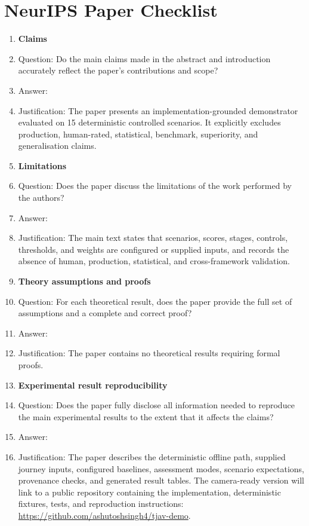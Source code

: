 \section*{NeurIPS Paper Checklist}

\begin{enumerate}

\item {\bf Claims}
\item[] Question: Do the main claims made in the abstract and introduction accurately reflect the paper's contributions and scope?
\item[] Answer: \answerYes{}
\item[] Justification: The paper presents an implementation-grounded demonstrator evaluated on 15 deterministic controlled scenarios. It explicitly excludes production, human-rated, statistical, benchmark, superiority, and generalisation claims.

\item {\bf Limitations}
\item[] Question: Does the paper discuss the limitations of the work performed by the authors?
\item[] Answer: \answerYes{}
\item[] Justification: The main text states that scenarios, scores, stages, controls, thresholds, and weights are configured or supplied inputs, and records the absence of human, production, statistical, and cross-framework validation.

\item {\bf Theory assumptions and proofs}
\item[] Question: For each theoretical result, does the paper provide the full set of assumptions and a complete and correct proof?
\item[] Answer: \answerNA{}
\item[] Justification: The paper contains no theoretical results requiring formal proofs.

\item {\bf Experimental result reproducibility}
\item[] Question: Does the paper fully disclose all information needed to reproduce the main experimental results to the extent that it affects the claims?
\item[] Answer: \answerYes{}
\item[] Justification: The paper describes the deterministic offline path, supplied journey inputs, configured baselines, assessment modes, scenario expectations, provenance checks, and generated result tables. The camera-ready version will link to a public repository containing the implementation, deterministic fixtures, tests, and reproduction instructions: \url{https://github.com/ashutoshsingh4/tjav-demo}.


\end{enumerate}
